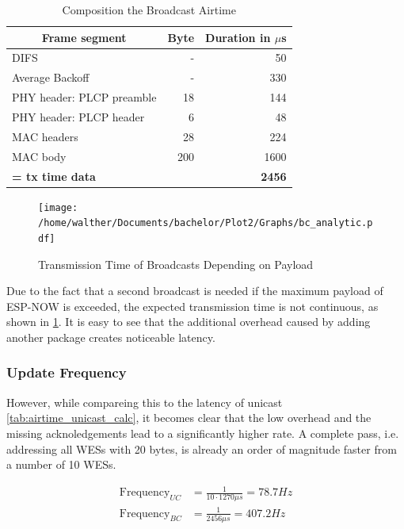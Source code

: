 \begin{table}[h]
	\centering
	\begin{tabular} { lrr }
		\toprule
		\multicolumn{1}{c}{Frame segment}
		& \multicolumn{1}{c}{Byte}
		& \multicolumn{1}{c}{Duration in $\mu$s} \\
		\midrule
		DIFS								& -		& 50 \\
		Average Backoff						& -		& 330 \\
		PHY header: PLCP preamble			& 18	& 144 \\
		PHY header: PLCP header				& 6 	& 48 \\
		MAC headers							& 28	& 224 \\
		MAC body							& 200 	& 1600 \\
		\textbf{= tx time data}				& 		& \textbf{2456} \\
		\bottomrule
	\end{tabular}
	\caption{Composition the Broadcast Airtime}
	\label{tab:airtime_broadcast_calc}
\end{table}

\begin{figure}[h]
	\centering
	\texttt{[image: /home/walther/Documents/bachelor/Plot2/Graphs/bc\_analytic.pdf]}
	\caption{Transmission Time of Broadcasts Depending on Payload}
	\label{fig:bc_analytic}
\end{figure}

Due to the fact that a second broadcast is needed if the maximum payload of ESP-NOW is exceeded,
the expected transmission time is not continuous, as shown in \cref{fig:bc_analytic}.
It is easy to see that the additional overhead caused by adding another package creates noticeable latency.

\subsubsection*{Update Frequency}

However, while compareing this to the latency of unicast \ref{tab:airtime_unicast_calc},
it becomes clear that the low overhead and the missing acknoledgements lead to a significantly higher rate.
A complete pass, i.e. addressing all WESs with 20 bytes, is already an order of magnitude faster from a number of 10 WESs.

\begin{align}
	\text{Frequency}_{UC} &= \frac{1}{10 \cdot 1270\mu s} = 78.7 Hz \\
	\text{Frequency}_{BC} &= \frac{1}{2456\mu s} = 407.2 Hz
\end{align}

